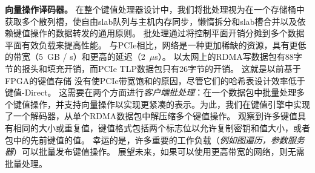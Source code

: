 
\textbf{向量操作译码器。}
在整个键值处理器设计中，我们将批处理视为在一个存储桶中获取多个散列槽，使自由slab队列与主机内存同步，懒惰拆分和slab槽合并以及依赖键值操作的数据转发的通用原则。
批处理通过将控制平面开销分摊到多个数据平面有效负载来提高性能。
与PCIe相比，网络是一种更加稀缺的资源，具有更低的带宽（5~GB / s）和更高的延迟（2~$\mu$s）。
以太网上的RDMA写数据包有88字节的报头和填充开销，而PCIe TLP数据包只有26字节的开销。
这就是以前基于FPGA的键值存储 \cite{blott13hotcloud,blott2015scaling} 没有使PCIe带宽饱和的原因，尽管它们的哈希表设计效率低于键值-Direct。
这需要在两个方面进行\textit {客户端批处理}：在一个数据包中批量处理多个键值操作，并支持向量操作以实现更紧凑的表示。为此，我们在键值引擎中实现了一个解码器，从单个RDMA数据包中解压缩多个键值操作。
观察到许多键值具有相同的大小或重复值，键值格式包括两个标志位以允许复制密钥和值大小，或者包中的先前键值的值。
幸运的是，许多重要的工作负载（\textit {例如图遍历，参数服务器}）可以批量发布键值操作。
展望未来，如果可以使用更高带宽的网络，则无需批量处理。
